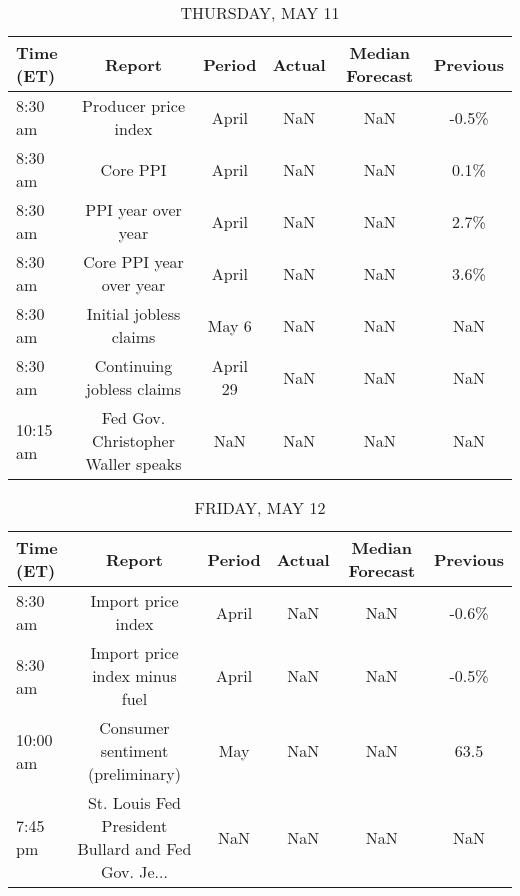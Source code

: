 \documentclass{article}%
\begin{document}
%


\begin{table}[htbp]%
\caption{THURSDAY, MAY 11}%
\centering%
\begin{adjustbox}{width=1\textwidth}%
\begin{tabular}{lccccc}
\toprule
Time (ET) &                             Report &   Period & Actual & Median Forecast & Previous \\
\midrule
  8:30 am &               Producer price index &    April &    NaN &             NaN &    -0.5\% \\
  8:30 am &                           Core PPI &    April &    NaN &             NaN &     0.1\% \\
  8:30 am &                 PPI year over year &    April &    NaN &             NaN &     2.7\% \\
  8:30 am &            Core PPI year over year &    April &    NaN &             NaN &     3.6\% \\
  8:30 am &             Initial jobless claims &    May 6 &    NaN &             NaN &      NaN \\
  8:30 am &          Continuing jobless claims & April 29 &    NaN &             NaN &      NaN \\
 10:15 am & Fed Gov. Christopher Waller speaks &      NaN &    NaN &             NaN &      NaN \\
\bottomrule
\end{tabular}
%
\end{adjustbox}%
\end{table}

%


\begin{table}[htbp]%
\caption{FRIDAY, MAY 12}%
\centering%
\begin{adjustbox}{width=1\textwidth}%
\begin{tabular}{lccccc}
\toprule
Time (ET) &                                             Report & Period & Actual & Median Forecast & Previous \\
\midrule
  8:30 am &                                 Import price index &  April &    NaN &             NaN &    -0.6\% \\
  8:30 am &                      Import price index minus fuel &  April &    NaN &             NaN &    -0.5\% \\
 10:00 am &                   Consumer sentiment (preliminary) &    May &    NaN &             NaN &     63.5 \\
  7:45 pm & St. Louis Fed President Bullard and Fed Gov. Je... &    NaN &    NaN &             NaN &      NaN \\
\bottomrule
\end{tabular}
%
\end{adjustbox}%
\end{table}
\end{document}
